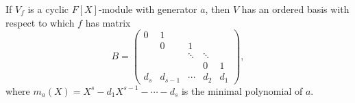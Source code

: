 If $V_f$ is a cyclic $F[X]$-module with generator $a$, then $V$ has an ordered basis with respect to which $f$ has matrix
$$B = \begin{pmatrix}
0 & 1 & & & \\
& 0 & 1 & & \\
& & \ddots & \ddots & \\
& & & 0 & 1 \\
d_s & d_{s-1} & \cdots & d_2 & d_1
\end{pmatrix},$$
where $m_a(X) = X^s - d_1 X^{s-1} - \cdots - d_s$ is the minimal polynomial of $a$.
